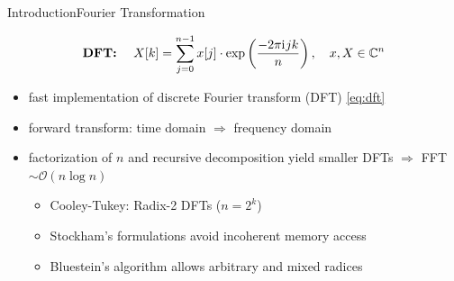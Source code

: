 \documentclass[t,11pt,hyperref={
  pdftitle = {gearshifft},
  pdfsubject = {gearshifft},
  pdfborder={0 0 0},
  colorlinks=true,
  urlcolor=red,
  citecolor=red,
  linkcolor=red,
  pdfauthor={Peter Steinbach, Matthias Werner}
  }
]{beamer}
\newcommand{\iu}{{\mathrm{i}\mkern1mu}}
\begin{document}
\begin{frame}{Introduction}{Fourier Transformation}

\vfill
  \begin{equation}
    \label{eq:dft}
    \text{\textbf{DFT:} }\quad X[k] = \sum_{j=0}^{n-1} x[j]\cdot\exp\left(\frac{-2\pi \iu jk}{n}\right),\quad x,X\in\mathbb{C}^n
  \end{equation}
\vfill  
  \begin{itemize}
  \item fast implementation of discrete Fourier transform (DFT) \eqref{eq:dft}
  \item forward transform: time domain $\Rightarrow$ frequency domain
  \item factorization of $n$ and recursive decomposition yield smaller DFTs $\Rightarrow$ FFT$\sim\mathcal{O}(n\log n)$

    \begin{itemize}
    \item Cooley-Tukey: Radix-2 DFTs ($n=2^k$)
    \item Stockham's formulations avoid incoherent memory access
    \item Bluestein's algorithm allows arbitrary and mixed radices
    \end{itemize}

  \end{itemize}
\vfill

\end{frame}
\end{document}
